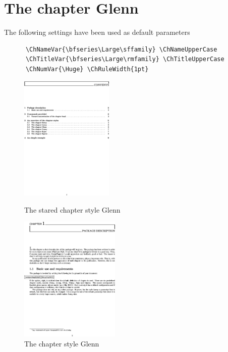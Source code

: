 \documentclass{report}
\begin{document}
    \section{The chapter Glenn}
    The following settings have been used as default parameters
    {\small\begin{verbatim}
      \ChNameVar{\bfseries\Large\sffamily} \ChNameUpperCase
      \ChTitleVar{\bfseries\Large\rmfamily} \ChTitleUpperCase
      \ChNumVar{\Huge} \ChRuleWidth{1pt}
    \end{verbatim}}
    \begin{figure}[h]
      \begin{minipage}{7 cm}
        \centerline{\includegraphics[height=6cm]{Glenns.eps}}
        \caption{The stared chapter style Glenn}
      \end{minipage}\hfill
      \begin{minipage}{7 cm}
        \centerline{\includegraphics[height=6cm]{Glenn.eps}}
        \caption{The chapter style Glenn}
      \end{minipage}\hfill
    \end{figure}
\end{document}
